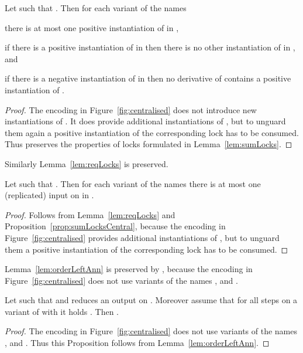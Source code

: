 \documentclass[]{eptcs}
\begin{document}
\begin{prop}
	Let  such that . Then for each variant  of the names 
	\begin{compactenum}
		\item there is at most one positive instantiation of  in ,
		\item if there is a positive instantiation of  in  then there is no other instantiation of  in , and
		\item if there is a negative instantiation of  in  then no derivative of  contains a positive instantiation of .
	\end{compactenum}
	\label{prop:sumLocksCentral}
\end{prop}

\begin{proof}
	The encoding in Figure~\ref{fig:centralised} does not introduce new instantiations of . It does provide additional instantiations of , but to unguard them again a positive instantiation of the corresponding lock  has to be consumed. Thus  preserves the properties of locks formulated in Lemma~\ref{lem:sumLocks}.
\end{proof}

Similarly Lemma~\ref{lem:reqLocks} is preserved.

\begin{prop}
	Let  such that . Then for each variant  of the names  there is at most one (replicated) input on  in .
	\label{prop:reqLocksCentral}
\end{prop}

\begin{proof}
	Follows from Lemma~\ref{lem:reqLocks} and Proposition~\ref{prop:sumLocksCentral}, because the encoding in Figure~\ref{fig:centralised} provides additional instantiations of , but to unguard them a positive instantiation of the corresponding lock  has to be consumed.
\end{proof}

Lemma~\ref{lem:orderLeftAnn} is preserved by , because the encoding in Figure~\ref{fig:centralised} does not use variants of the names , and .

\begin{prop}
	Let  such that  and  reduces an output on . Moreover assume that for all steps  on a variant of  with  it holds .
	Then .
	\label{prop:orderLeftAnnCentral}
\end{prop}

\begin{proof}
	The encoding in Figure~\ref{fig:centralised} does not use variants of the names , and . Thus this Proposition follows from Lemma~\ref{lem:orderLeftAnn}.
\end{proof}
\end{document}
